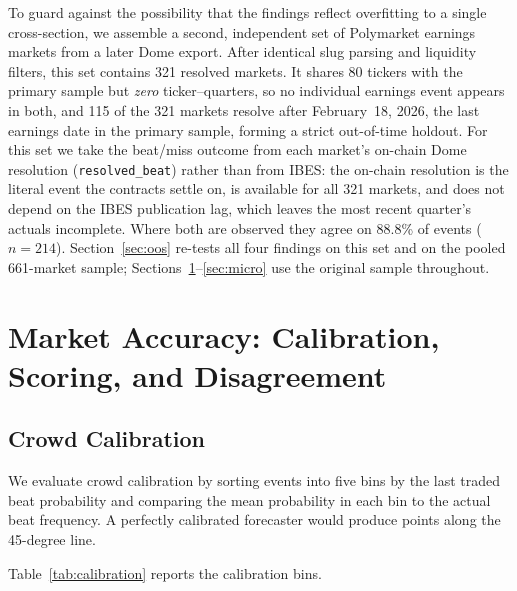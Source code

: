 \documentclass[11pt]{article}
\begin{document}
To guard against the possibility that the findings reflect overfitting to a single cross-section, we assemble a second, independent set of Polymarket earnings markets from a later Dome export. After identical slug parsing and liquidity filters, this set contains 321 resolved markets. It shares 80 tickers with the primary sample but \textit{zero} ticker--quarters, so no individual earnings event appears in both, and 115 of the 321 markets resolve after February~18, 2026, the last earnings date in the primary sample, forming a strict out-of-time holdout. For this set we take the beat/miss outcome from each market's on-chain Dome resolution (\texttt{resolved\_beat}) rather than from IBES: the on-chain resolution is the literal event the contracts settle on, is available for all 321 markets, and does not depend on the IBES publication lag, which leaves the most recent quarter's actuals incomplete. Where both are observed they agree on 88.8\% of events ($n = 214$). Section~\ref{sec:oos} re-tests all four findings on this set and on the pooled 661-market sample; Sections~\ref{sec:accuracy}--\ref{sec:micro} use the original sample throughout.

\section{Market Accuracy: Calibration, Scoring, and Disagreement} \label{sec:accuracy}

\subsection{Crowd Calibration}

We evaluate crowd calibration by sorting events into five bins by the last traded beat probability and comparing the mean probability in each bin to the actual beat frequency. A perfectly calibrated forecaster would produce points along the 45-degree line.

Table~\ref{tab:calibration} reports the calibration bins.
\end{document}
